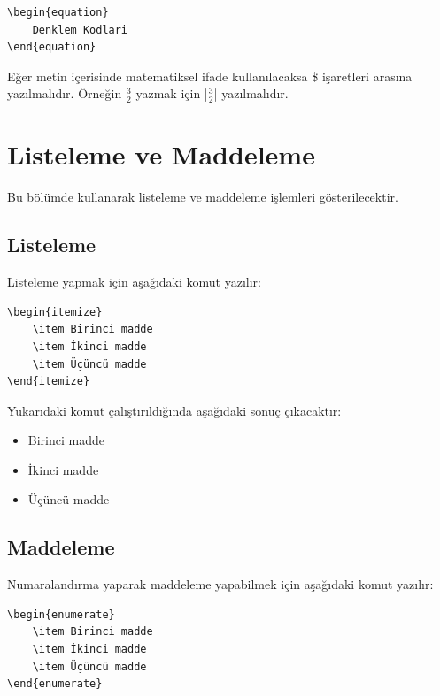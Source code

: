 \begin{verbatim}
\begin{equation}
    Denklem Kodlari
\end{equation}
\end{verbatim}

Eğer metin içerisinde matematiksel ifade kullanılacaksa \$ işaretleri arasına yazılmalıdır. Örneğin $\frac{3}{2}$ yazmak için |$\frac{3}{2}$| yazılmalıdır.

\chapter{Listeleme ve Maddeleme}
Bu bölümde \latex kullanarak listeleme ve maddeleme işlemleri gösterilecektir.

\section{Listeleme}
Listeleme yapmak için aşağıdaki komut yazılır:

\begin{verbatim}
\begin{itemize}
    \item Birinci madde
    \item İkinci madde
    \item Üçüncü madde
\end{itemize}
\end{verbatim}

Yukarıdaki komut çalıştırıldığında aşağıdaki sonuç çıkacaktır:

\begin{itemize}
    \item Birinci madde
    \item İkinci madde
    \item Üçüncü madde
\end{itemize}

\section{Maddeleme}
Numaralandırma yaparak maddeleme yapabilmek için aşağıdaki komut yazılır:

\begin{verbatim}
\begin{enumerate}
    \item Birinci madde
    \item İkinci madde
    \item Üçüncü madde
\end{enumerate}
\end{verbatim}

